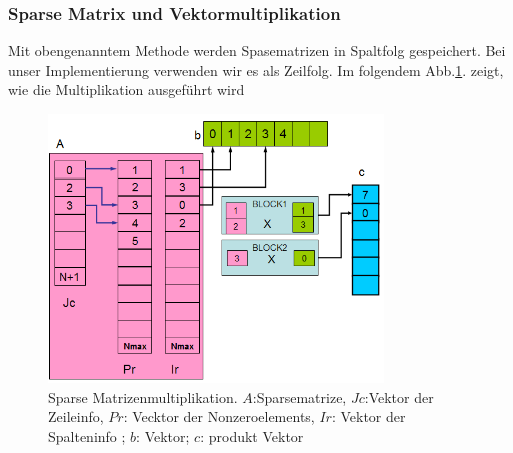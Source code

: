 
\subsubsection{Sparse Matrix und Vektormultiplikation}




Mit obengenanntem Methode werden Spasematrizen in Spaltfolg gespeichert. Bei unser Implementierung verwenden wir es als Zeilfolg. Im folgendem Abb.\ref{sparseMul}. zeigt, wie die Multiplikation ausgeführt wird

\begin{figure}[htbp]
\includegraphics[width=3.5in]{../xby/pic//sparseMul}
\caption{Sparse Matrizenmultiplikation. $A$:Sparsematrize, $Jc$:Vektor der Zeileinfo, $Pr$: Vecktor der Nonzeroelements, $Ir$: Vektor der Spalteninfo ; $b$: Vektor; $c$: produkt Vektor}
\label{sparseMul}
\end{figure}